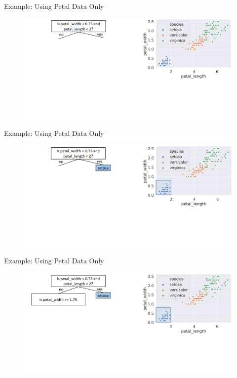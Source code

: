 \documentclass[aspectratio=169]{../latex_main/tntbeamer}  %
\begin{document}
	
	\begin{frame}{Example: Using Petal Data Only}
	    \begin{figure}
	        \includegraphics[scale=.34]{Bild6}
	    \end{figure}
	\end{frame}
	
	
	\begin{frame}{Example: Using Petal Data Only}
	    \begin{figure}
	        \includegraphics[scale=.34]{Bild7}
	    \end{figure}
	\end{frame}
	
	
	\begin{frame}{Example: Using Petal Data Only}
	    \begin{figure}
	        \includegraphics[scale=.34]{Bild8}
	    \end{figure}
	\end{frame}
	
\end{document}
